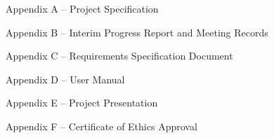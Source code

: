 \documentclass[
]{article}
\begin{document}
\newpage

Appendix A -- Project Specification

Appendix B -- Interim Progress Report and Meeting Records

Appendix C -- Requirements Specification Document

Appendix D -- User Manual

Appendix E -- Project Presentation

Appendix F -- Certificate of Ethics Approval
\end{document}
